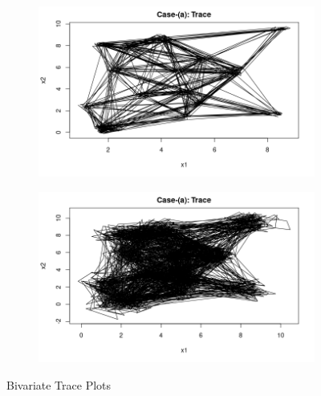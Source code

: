 \documentclass{article}
\begin{document}
\begin{figure}[ht]
\begin{subfigure}{.5\textwidth}
  \centering
  \includegraphics[width=.8\linewidth]{a2.png}  
  \label{fig:sub-first}
\end{subfigure}
\begin{subfigure}{.5\textwidth}
  \centering
  \includegraphics[width=.8\linewidth]{b2.png}  
  \label{fig:sub-second}
\end{subfigure}
\caption{Bivariate Trace Plots}
\label{fig:fig}
\end{figure}
\end{document}

